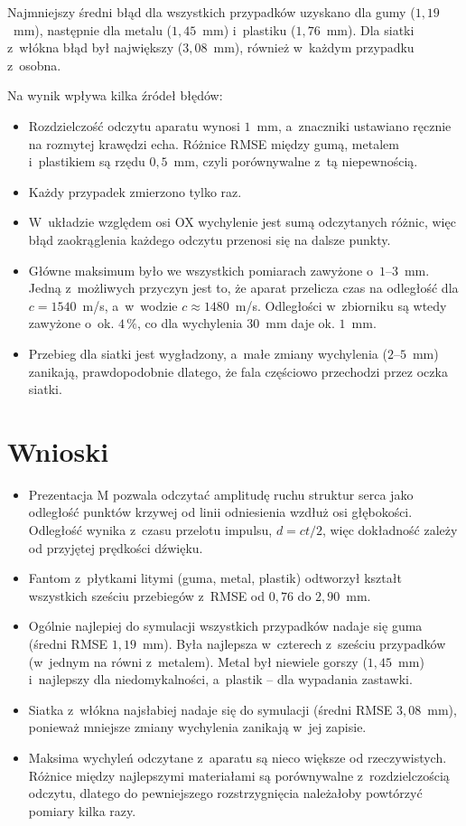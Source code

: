 \documentclass[12pt,a4paper]{article}
\begin{document}
Najmniejszy średni błąd dla wszystkich przypadków uzyskano dla gumy ($1{,}19$~mm),
następnie dla metalu ($1{,}45$~mm) i~plastiku ($1{,}76$~mm). Dla siatki z~włókna błąd był
największy ($3{,}08$~mm), również w~każdym przypadku z~osobna.

Na wynik wpływa kilka źródeł błędów:
\begin{itemize}
  \item Rozdzielczość odczytu aparatu wynosi $1$~mm, a~znaczniki ustawiano ręcznie na
    rozmytej krawędzi echa. Różnice RMSE między gumą, metalem i~plastikiem są rzędu
    $0{,}5$~mm, czyli porównywalne z~tą niepewnością.
  \item Każdy przypadek zmierzono tylko raz.
  \item W~układzie względem osi OX wychylenie jest sumą odczytanych różnic, więc błąd
    zaokrąglenia każdego odczytu przenosi się na dalsze punkty.
  \item Główne maksimum było we wszystkich pomiarach zawyżone o~$1$--$3$~mm. Jedną z~możliwych
    przyczyn jest to, że aparat przelicza czas na odległość dla $c = 1540$~m/s, a~w~wodzie
    $c \approx 1480$~m/s. Odległości w~zbiorniku są wtedy zawyżone o~ok. $4\,\%$, co dla
    wychylenia $30$~mm daje ok. $1$~mm.
  \item Przebieg dla siatki jest wygładzony, a~małe zmiany wychylenia ($2$--$5$~mm) zanikają,
    prawdopodobnie dlatego, że fala częściowo przechodzi przez oczka siatki.
\end{itemize}

\section{Wnioski}

\begin{itemize}
  \item Prezentacja M pozwala odczytać amplitudę ruchu struktur serca jako odległość punktów
    krzywej od linii odniesienia wzdłuż osi głębokości. Odległość wynika z~czasu przelotu
    impulsu, $d = ct/2$, więc dokładność zależy od przyjętej prędkości dźwięku.
  \item Fantom z~płytkami litymi (guma, metal, plastik) odtworzył kształt wszystkich sześciu
    przebiegów z~RMSE od $0{,}76$ do $2{,}90$~mm.
  \item Ogólnie najlepiej do symulacji wszystkich przypadków nadaje się guma (średni RMSE
    $1{,}19$~mm). Była najlepsza w~czterech z~sześciu przypadków (w~jednym na równi
    z~metalem). Metal był niewiele gorszy
    ($1{,}45$~mm) i~najlepszy dla niedomykalności, a~plastik -- dla wypadania zastawki.
  \item Siatka z~włókna najsłabiej nadaje się do symulacji (średni RMSE $3{,}08$~mm), ponieważ
    mniejsze zmiany wychylenia zanikają w~jej zapisie.
  \item Maksima wychyleń odczytane z~aparatu są nieco większe od rzeczywistych.
    Różnice między najlepszymi materiałami są porównywalne z~rozdzielczością odczytu,
    dlatego do pewniejszego rozstrzygnięcia należałoby powtórzyć pomiary kilka razy.
\end{itemize}
\end{document}
